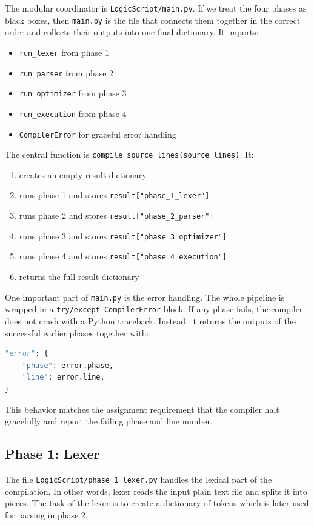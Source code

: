 \documentclass[11pt]{article}
\begin{document}
The modular coordinator is \texttt{LogicScript/main.py}. If we treat the four phases as black boxes, then \texttt{main.py} is the file that connects them together in the correct order and collects their outputs into one final dictionary. It imports:
\begin{itemize}
    \item \texttt{run\_lexer} from phase 1
    \item \texttt{run\_parser} from phase 2
    \item \texttt{run\_optimizer} from phase 3
    \item \texttt{run\_execution} from phase 4
    \item \texttt{CompilerError} for graceful error handling
\end{itemize}

The central function is \texttt{compile\_source\_lines(source\_lines)}. It:
\begin{enumerate}
    \item creates an empty result dictionary
    \item runs phase 1 and stores \texttt{result["phase\_1\_lexer"]}
    \item runs phase 2 and stores \texttt{result["phase\_2\_parser"]}
    \item runs phase 3 and stores \texttt{result["phase\_3\_optimizer"]}
    \item runs phase 4 and stores \texttt{result["phase\_4\_execution"]}
    \item returns the full result dictionary
\end{enumerate}

One important part of \texttt{main.py} is the error handling. The whole pipeline is wrapped in a \texttt{try/except CompilerError} block. If any phase fails, the compiler does not crash with a Python traceback. Instead, it returns the outputs of the successful earlier phases together with:
\begin{lstlisting}[language=Python]
"error": {
    "phase": error.phase,
    "line": error.line,
}
\end{lstlisting}
This behavior matches the assignment requirement that the compiler halt gracefully and report the failing phase and line number.

\subsection{Phase 1: Lexer}
The file \texttt{LogicScript/phase\_1\_lexer.py} handles the lexical part of the compilation. In other words, lexer reads the input plain text file and splits it into pieces. The task of the lexer is to create a dictionary of tokens which is later used for parsing in phase 2.
\end{document}
